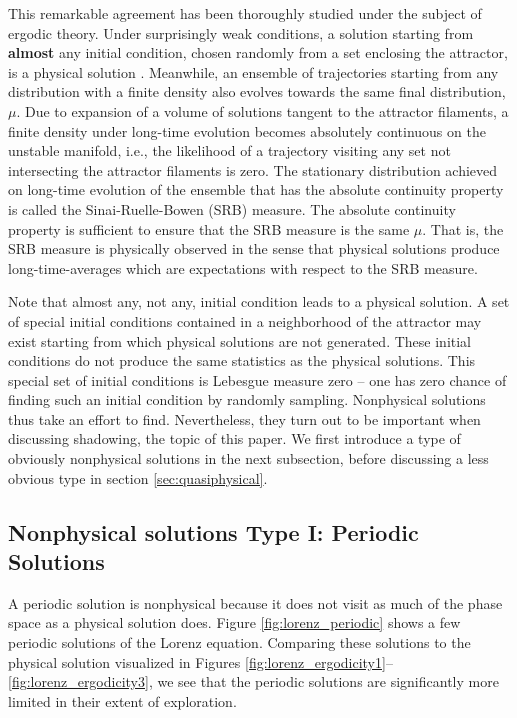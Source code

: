 This remarkable agreement has been thoroughly studied under the subject
of ergodic theory. Under surprisingly weak conditions, a solution starting from
{\bf almost} any initial condition, chosen randomly from a set enclosing the attractor, is a physical solution \cite{young}.   
Meanwhile, an ensemble of trajectories starting from any distribution with a 
finite density also evolves towards the same final distribution, $\mu$. Due to expansion of a volume of solutions tangent to the attractor filaments, a finite density under long-time evolution becomes absolutely continuous on the unstable manifold, i.e., the likelihood of a trajectory visiting any set not intersecting the attractor filaments is zero. The 
stationary distribution achieved on long-time evolution of the ensemble that has the absolute continuity property is called the Sinai-Ruelle-Bowen
(SRB) measure. The absolute continuity property is sufficient to ensure that the SRB measure is the same $\mu.$ That is, the SRB measure is physically observed in the sense that physical solutions produce long-time-averages which are expectations with respect to the SRB measure. 

Note that almost any, not any, initial condition leads to a physical solution. A set of special initial conditions
contained in a neighborhood of the attractor may exist starting from which physical solutions are not generated. These initial conditions do not produce the same statistics as the physical solutions. This special set of initial conditions is Lebesgue measure zero -- one
has zero chance of finding such an initial condition by randomly sampling.
Nonphysical solutions thus take an effort to find.  Nevertheless, they
turn out to be important when discussing shadowing, the topic of this paper.
We first introduce a type of obviously nonphysical solutions in the next
subsection, before discussing a less obvious type in section \ref{sec:quasiphysical}.

\subsection{Nonphysical solutions Type I: Periodic Solutions}

A periodic solution is nonphysical because it 
does not visit as much
of the phase space as a physical solution does.
Figure \ref{fig:lorenz_periodic} shows
a few periodic solutions of the Lorenz equation. Comparing these solutions
to the physical solution visualized in Figures \ref{fig:lorenz_ergodicity1}--\ref{fig:lorenz_ergodicity3},
we see that the periodic solutions are significantly more limited in their
extent of exploration.

